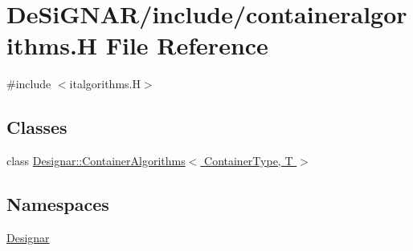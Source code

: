 \hypertarget{containeralgorithms_8_h}{}\section{De\+Si\+G\+N\+A\+R/include/containeralgorithms.H File Reference}
\label{containeralgorithms_8_h}
{\ttfamily \#include $<$italgorithms.\+H$>$}\newline
\subsection*{Classes}
\begin{DoxyCompactItemize}
\item 
class \hyperlink{class_designar_1_1_container_algorithms}{Designar\+::\+Container\+Algorithms$<$ Container\+Type, T $>$}
\end{DoxyCompactItemize}
\subsection*{Namespaces}
\begin{DoxyCompactItemize}
\item 
 \hyperlink{namespace_designar}{Designar}
\end{DoxyCompactItemize}
